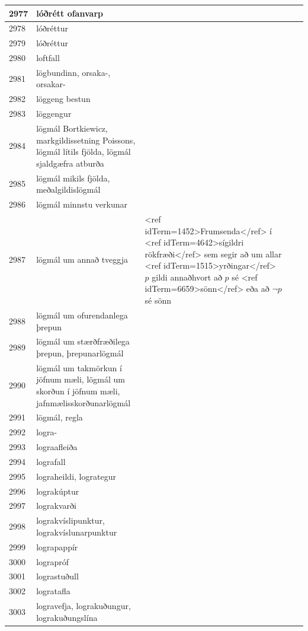 \begin{longtable}{p{}|p{}|p{}|p{}|p{}}
\hline
2977 & lóðrétt ofanvarp &  &  &  \\
\hline
2978 & lóðréttur &  &  &  \\
\hline
2979 & lóðréttur &  &  &  \\
\hline
2980 & loftfall &  &  &  \\
\hline
2981 & lögbundinn, orsaka-, orsakar- &  &  &  \\
\hline
2982 & löggeng bestun &  &  &  \\
\hline
2983 & löggengur &  &  &  \\
\hline
2984 & lögmál Bortkiewicz, markgildissetning Poissons, lögmál lítils fjölda, lögmál sjaldgæfra atburða &  &  &  \\
\hline
2985 & lögmál mikils fjölda, meðalgildislögmál &  &  &  \\
\hline
2986 & lögmál minnstu verkunar &  &  &  \\
\hline
2987 & lögmál um annað tveggja & <ref idTerm=1452>Frumsenda</ref> í <ref idTerm=4642>sígildri rökfræði</ref> sem segir að um allar <ref idTerm=1515>yrðingar</ref> $p$ gildi annaðhvort að $p$ sé <ref idTerm=6659>sönn</ref> eða að $\lnot p$ sé sönn &  &  \\
\hline
2988 & lögmál um ofurendanlega þrepun &  &  &  \\
\hline
2989 & lögmál um stærðfræðilega þrepun, þrepunarlögmál &  &  &  \\
\hline
2990 & lögmál um takmörkun í jöfnum mæli, lögmál um skorðun í jöfnum mæli, jafnmælisskorðunarlögmál &  &  &  \\
\hline
2991 & lögmál, regla &  &  &  \\
\hline
2992 & logra- &  &  &  \\
\hline
2993 & lograafleiða &  &  &  \\
\hline
2994 & lografall &  &  &  \\
\hline
2995 & lograheildi, logrategur &  &  &  \\
\hline
2996 & lograkúptur &  &  &  \\
\hline
2997 & lograkvarði &  &  &  \\
\hline
2998 & lograkvíslipunktur, lograkvíslunarpunktur &  &  &  \\
\hline
2999 & lograpappír &  &  &  \\
\hline
3000 & lograpróf &  &  &  \\
\hline
3001 & lograstuðull &  &  &  \\
\hline
3002 & logratafla &  &  &  \\
\hline
3003 & logravefja, lograkuðungur, lograkuðungslína &  &  &  \\

\end{longtable}
